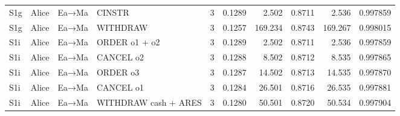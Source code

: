 \documentclass[10pt,letterpaper]{article}
\begin{document}
{\begin{longtable}{@{}lll>{\raggedright\arraybackslash}p{2.6cm}rrrrrr@{}}
S1g & Alice & Ea→Ma & CINSTR & 3 & 0.1289 & 2.502 & 0.8711 & 2.536 & 0.997859 \\
S1g & Alice & Ea→Ma & WITHDRAW & 3 & 0.1257 & 169.234 & 0.8743 & 169.267 & 0.998015 \\
S1i & Alice & Ea→Ma & ORDER o1 + o2 & 3 & 0.1289 & 2.502 & 0.8711 & 2.536 & 0.997859 \\
S1i & Alice & Ea→Ma & CANCEL o2 & 3 & 0.1288 & 8.502 & 0.8712 & 8.535 & 0.997865 \\
S1i & Alice & Ea→Ma & ORDER o3 & 3 & 0.1287 & 14.502 & 0.8713 & 14.535 & 0.997870 \\
S1i & Alice & Ea→Ma & CANCEL o1 & 3 & 0.1284 & 26.501 & 0.8716 & 26.535 & 0.997881 \\
S1i & Alice & Ea→Ma & WITHDRAW cash + ARES & 3 & 0.1280 & 50.501 & 0.8720 & 50.534 & 0.997904 \\
\end{longtable}}
\end{document}
